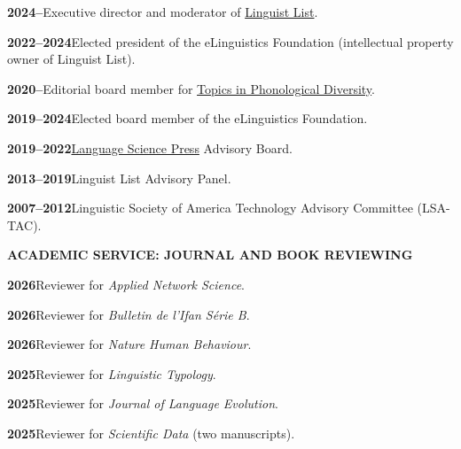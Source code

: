 \documentclass[11pt]{article}
\newcommand{\hangpara}{
 \setlength{\parindent}{0in} %
 \hangindent=0.42in %
}
\begin{document}
\hangpara
{\bf 2024--}\hspace{1ex}Executive director and moderator of \href{https://linguistlist.org}{Linguist List}.

\vskip 6pt
\hangpara
{\bf 2022--2024}\hspace{1ex}Elected president of the eLinguistics Foundation (intellectual property owner of Linguist List).

\vskip 6pt
\hangpara
{\bf 2020--}\hspace{1ex}Editorial board member for \href{https://langsci-press.org/catalog/series/tpd}{Topics in Phonological Diversity}.

\vskip 6pt
\hangpara
{\bf 2019--2024}\hspace{1ex}Elected board member of the eLinguistics Foundation.

\vskip 6pt
\hangpara
{\bf 2019--2022}\hspace{1ex}\href{https://langsci-press.org/}{Language Science Press} Advisory Board.

\vskip 6pt
\hangpara
{\bf 2013--2019}\hspace{1ex}Linguist List Advisory Panel.

\vskip 6pt
\hangpara
{\bf 2007--2012}\hspace{1ex}Linguistic Society of America Technology Advisory Committee (LSA-TAC).

\vskip 20pt
\begin{flushleft}
{\bf ACADEMIC SERVICE: JOURNAL AND BOOK REVIEWING}
\end{flushleft}

\hangpara
{\bf 2026}\hspace{1ex}Reviewer for \textit{Applied Network Science}.

\vskip 6pt
\hangpara
{\bf 2026}\hspace{1ex}Reviewer for \textit{Bulletin de l’Ifan Série B}.

\vskip 6pt
\hangpara
{\bf 2026}\hspace{1ex}Reviewer for \textit{Nature Human Behaviour}.

\vskip 6pt
\hangpara
{\bf 2025}\hspace{1ex}Reviewer for \textit{Linguistic Typology}.

\vskip 6pt
\hangpara
{\bf 2025}\hspace{1ex}Reviewer for \textit{Journal of Language Evolution}.

\vskip 6pt
\hangpara
{\bf 2025}\hspace{1ex}Reviewer for \textit{Scientific Data} (two manuscripts).
\end{document}
